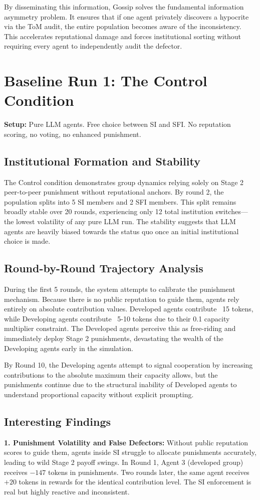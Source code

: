 \documentclass[11pt,a4paper]{article}
\begin{document}
By disseminating this information, Gossip solves the fundamental information asymmetry problem. It ensures that if one agent privately discovers a hypocrite via the ToM audit, the entire population becomes aware of the inconsistency. This accelerates reputational damage and forces institutional sorting without requiring every agent to independently audit the defector.

\section{Baseline Run 1: The Control Condition}
\textbf{Setup:} Pure LLM agents. Free choice between SI and SFI. No reputation scoring, no voting, no enhanced punishment.

\subsection{Institutional Formation and Stability}
The Control condition demonstrates group dynamics relying solely on Stage 2 peer-to-peer punishment without reputational anchors. By round 2, the population splits into 5 SI members and 2 SFI members. This split remains broadly stable over 20 rounds, experiencing only 12 total institution switches—the lowest volatility of any pure LLM run. The stability suggests that LLM agents are heavily biased towards the status quo once an initial institutional choice is made.

\subsection{Round-by-Round Trajectory Analysis}
During the first 5 rounds, the system attempts to calibrate the punishment mechanism. Because there is no public reputation to guide them, agents rely entirely on absolute contribution values. Developed agents contribute ~15 tokens, while Developing agents contribute ~5-10 tokens due to their 0.1 capacity multiplier constraint. The Developed agents perceive this as free-riding and immediately deploy Stage 2 punishments, devastating the wealth of the Developing agents early in the simulation. 

By Round 10, the Developing agents attempt to signal cooperation by increasing contributions to the absolute maximum their capacity allows, but the punishments continue due to the structural inability of Developed agents to understand proportional capacity without explicit prompting.

\subsection{Interesting Findings}
\textbf{1. Punishment Volatility and False Defectors:}
Without public reputation scores to guide them, agents inside SI struggle to allocate punishments accurately, leading to wild Stage 2 payoff swings. In Round 1, Agent 3 (developed group) receives $-147$ tokens in punishments. Two rounds later, the same agent receives $+20$ tokens in rewards for the identical contribution level. The SI enforcement is real but highly reactive and inconsistent.
\end{document}
